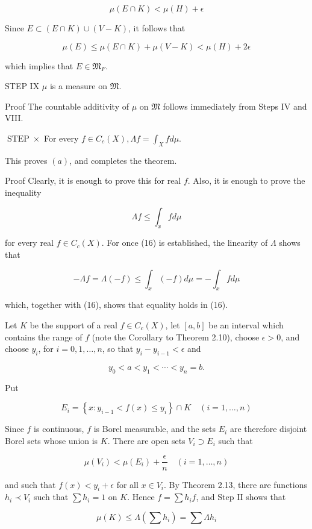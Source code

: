 \documentclass[10pt]{article}
\begin{document}
$$
\mu(E \cap K)<\mu(H)+\epsilon
$$

Since $E \subset(E \cap K) \cup(V-K)$, it follows that

$$
\mu(E) \leq \mu(E \cap K)+\mu(V-K)<\mu(H)+2 \epsilon
$$

which implies that $E \in \mathfrak{M}_{F}$.

STEP IX $\mu$ is a measure on $\mathfrak{M}$.

Proof The countable additivity of $\mu$ on $\mathfrak{M}$ follows immediately from Steps IV and VIII.

$\operatorname{STEP} \times$ For every $f \in C_{c}(X), \Lambda f=\int_{X} f d \mu$.

This proves $(a)$, and completes the theorem.

Proof Clearly, it is enough to prove this for real $f$. Also, it is enough to prove the inequality

$$
\Lambda f \leq \int_{x} f d \mu
$$

for every real $f \in C_{c}(X)$. For once (16) is established, the linearity of $\Lambda$ shows that

$$
-\Lambda f=\Lambda(-f) \leq \int_{x}(-f) d \mu=-\int_{x} f d \mu
$$

which, together with (16), shows that equality holds in (16).

Let $K$ be the support of a real $f \in C_{c}(X)$, let $[a, b]$ be an interval which contains the range of $f$ (note the Corollary to Theorem 2.10), choose $\epsilon>0$, and choose $y_{i}$, for $i=0,1, \ldots, n$, so that $y_{i}-y_{i-1}<\epsilon$ and

$$
y_{0}<a<y_{1}<\cdots<y_{n}=b .
$$

Put

$$
E_{i}=\left\{x: y_{i-1}<f(x) \leq y_{i}\right\} \cap K \quad(i=1, \ldots, n)
$$

Since $f$ is continuous, $f$ is Borel measurable, and the sets $E_{i}$ are therefore disjoint Borel sets whose union is $K$. There are open sets $V_{i} \supset E_{i}$ such that

$$
\mu\left(V_{i}\right)<\mu\left(E_{i}\right)+\frac{\epsilon}{n} \quad(i=1, \ldots, n)
$$

and such that $f(x)<y_{i}+\epsilon$ for all $x \in V_{i}$. By Theorem 2.13, there are functions $h_{i} \prec V_{i}$ such that $\sum h_{i}=1$ on $K$. Hence $f=\sum h_{i} f$, and Step II shows that

$$
\mu(K) \leq \Lambda\left(\sum h_{i}\right)=\sum \Lambda h_{i}
$$
\end{document}
